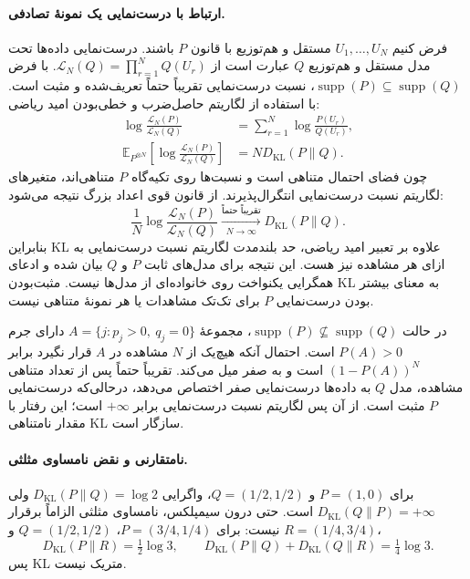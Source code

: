\paragraph{ارتباط با درست‌نمایی یک نمونهٔ تصادفی.}
فرض کنیم $U_1,\ldots,U_N$ مستقل و هم‌توزیع با قانون $P$ باشند. درست‌نمایی داده‌ها تحت مدل مستقل و هم‌توزیع $Q$ عبارت است از
$\mathcal L_N(Q)=\prod_{r=1}^N Q(U_r)$.
با فرض $\operatorname{supp}(P)\subseteq\operatorname{supp}(Q)$، نسبت درست‌نمایی تقریباً حتماً تعریف‌شده و مثبت است. با استفاده از لگاریتم حاصل‌ضرب و خطی‌بودن امید ریاضی:
\begin{equation}\label{eq:app-pd-kl-sample-likelihood}
\begin{aligned}
\log\frac{\mathcal L_N(P)}{\mathcal L_N(Q)}
&=\sum_{r=1}^N\log\frac{P(U_r)}{Q(U_r)},\\
\mathbb E_{P^{\otimes N}}\left[
\log\frac{\mathcal L_N(P)}{\mathcal L_N(Q)}
\right]&=N D_{\mathrm{KL}}(P\|Q).
\end{aligned}
\end{equation}
چون فضای احتمال متناهی است و نسبت‌ها روی تکیه‌گاه $P$ متناهی‌اند، متغیرهای لگاریتم نسبت درست‌نمایی انتگرال‌پذیرند. از قانون قوی اعداد بزرگ نتیجه می‌شود:
\begin{equation}\label{eq:app-pd-kl-likelihood-limit}
\boxed{
\frac{1}{N}\log\frac{\mathcal L_N(P)}{\mathcal L_N(Q)}
\xrightarrow[N\to\infty]{\text{تقریباً حتماً}}
D_{\mathrm{KL}}(P\|Q).
}
\end{equation}
بنابراین KL علاوه بر تعبیر امید ریاضی، حد بلندمدت لگاریتم نسبت درست‌نمایی به ازای هر مشاهده نیز هست. این نتیجه برای مدل‌های ثابت $P$ و $Q$ بیان شده و ادعای همگرایی یکنواخت روی خانواده‌ای از مدل‌ها نیست. مثبت‌بودن KL به معنای بیشتر بودن درست‌نمایی $P$ برای تک‌تک مشاهدات یا هر نمونهٔ متناهی نیست.

در حالت $\operatorname{supp}(P)\nsubseteq\operatorname{supp}(Q)$، مجموعهٔ $A=\{j:p_j>0,\ q_j=0\}$ دارای جرم $P(A)>0$ است. احتمال آنکه هیچ‌یک از $N$ مشاهده در $A$ قرار نگیرد برابر $(1-P(A))^N$ است و به صفر میل می‌کند. تقریباً حتماً پس از تعداد متناهی مشاهده، مدل $Q$ به داده‌ها درست‌نمایی صفر اختصاص می‌دهد، درحالی‌که درست‌نمایی $P$ مثبت است. از آن پس لگاریتم نسبت درست‌نمایی برابر $+\infty$ است؛ این رفتار با مقدار نامتناهی KL سازگار است.

\paragraph{نامتقارنی و نقض نامساوی مثلثی.}
برای $P=(1,0)$ و $Q=(1/2,1/2)$، واگرایی $D_{\mathrm{KL}}(P\|Q)=\log2$ ولی $D_{\mathrm{KL}}(Q\|P)=+\infty$ است. حتی درون سیمپلکس، نامساوی مثلثی الزاماً برقرار نیست: برای $P=(3/4,1/4)$، $Q=(1/2,1/2)$ و $R=(1/4,3/4)$،
\begin{equation}\label{eq:app-pd-kl-not-metric}
D_{\mathrm{KL}}(P\|R)=\tfrac12\log3,\qquad
D_{\mathrm{KL}}(P\|Q)+D_{\mathrm{KL}}(Q\|R)=\tfrac14\log3.
\end{equation}
پس KL متریک نیست.

